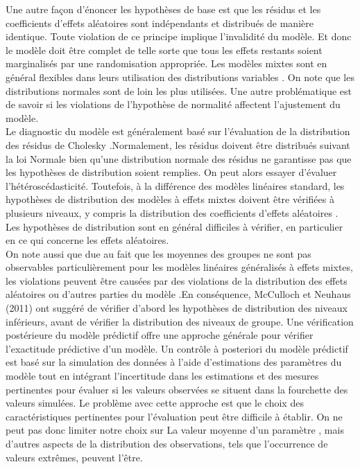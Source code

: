 \documentclass{article}
\begin{document}
 Une autre façon d'énoncer les hypothèses de base est que les résidus et les coefficients d'effets aléatoires sont indépendants et distribués de manière identique. Toute violation de ce principe implique l'invalidité du modèle. Et donc le modèle doit être complet de telle sorte que tous les effets restants soient marginalisés par une randomisation appropriée. Les modèles mixtes sont en général  flexibles dans leurs utilisation des distributions variables . On note que les distributions normales sont de loin les plus utilisées. Une autre problématique est de savoir si les violations de l'hypothèse de normalité affectent l'ajustement du modèle. \\ 
Le diagnostic du modèle est généralement basé sur l'évaluation de la distribution des résidus de Cholesky .Normalement, les résidus doivent être distribués suivant la loi Normale  bien qu'une distribution normale des résidus ne garantisse pas que les hypothèses de distribution soient remplies. On peut alors essayer d’évaluer  l'hétéroscédasticité. Toutefois, à la différence des modèles linéaires standard, les hypothèses de distribution des modèles à effets mixtes doivent être vérifiées à plusieurs niveaux, y compris la distribution des coefficients d'effets aléatoires .
Les hypothèses de distribution sont en général difficiles à vérifier, en particulier en ce qui concerne les effets aléatoires. \\
On note aussi que due au fait que les moyennes des groupes ne sont pas observables particulièrement pour les modèles linéaires généralisés à effets mixtes, les violations peuvent être causées par des violations de la distribution des effets aléatoires ou d'autres parties du modèle .En conséquence, McCulloch et Neuhaus (2011) ont suggéré de vérifier d'abord les hypothèses de distribution des niveaux inférieurs, avant de vérifier la distribution des niveaux de groupe. Une vérification postérieure du modèle prédictif offre une approche générale pour vérifier l'exactitude prédictive d'un modèle. Un contrôle à posteriori du modèle prédictif est basé sur la simulation des données à l'aide d'estimations des paramètres du modèle tout en intégrant l'incertitude dans les estimations et des mesures pertinentes pour évaluer si les valeurs observées se situent dans la fourchette des valeurs simulées. Le problème avec cette approche est que le choix des caractéristiques pertinentes pour l'évaluation peut être difficile à établir. On ne peut pas donc limiter notre choix sur  La valeur moyenne d'un paramètre , mais d'autres aspects de la distribution des observations, tels que l'occurrence de valeurs extrêmes, peuvent l'être.\\ 
\end{document}
